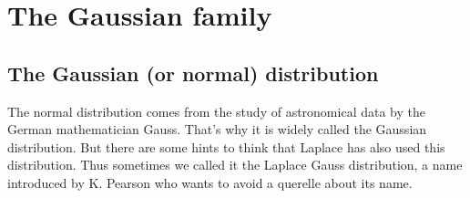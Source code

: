 % 	
%
%
%

\chapter{The Gaussian family}
\section{The Gaussian (or normal) distribution}


The normal distribution comes from the study of astronomical data by the German mathematician Gauss. That's why it is widely called the Gaussian distribution. But there are some hints to think that Laplace has also used this distribution. Thus sometimes we called it the Laplace Gauss distribution, a name introduced by K. Pearson who wants to avoid a querelle about its name.


